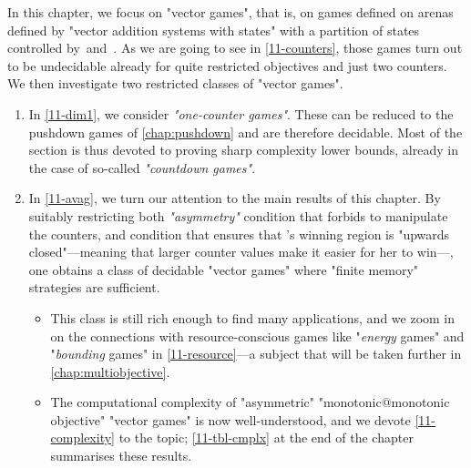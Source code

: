 In this chapter, we focus on "vector games", that is, on games defined
on arenas defined by "vector addition systems with states" with a
partition of states controlled by~\Eve and~\Adam.  As we are going to
see in \cref{11-counters}, those games turn out to be undecidable
already for quite restricted objectives and just two counters.  We
then investigate two restricted classes of "vector games".
\begin{enumerate}
\item In \cref{11-dim1}, we consider \emph{"one-counter games"}.  These can
  be reduced to the pushdown games of \cref{chap:pushdown} and are
  therefore decidable.  Most of the section is thus devoted to proving
  sharp complexity lower bounds, already in the case of so-called
  \emph{"countdown games"}.
\item In \cref{11-avag}, we turn our attention to the main results of
  this chapter.  By suitably restricting both
  \emph{"asymmetry"} condition that forbids \Adam to manipulate the
  counters, and
    condition that ensures that \Eve's winning region is "upwards
    closed"---meaning that larger counter values make it easier for
    her to win---,
  one obtains a class of decidable "vector games" where "finite
  memory" strategies are sufficient.
  \begin{itemize}
  \item   This class is still rich enough to find many applications, and we
  zoom in on the connections with resource-conscious games like
  "\emph{energy} games" and "\emph{bounding} games" in
  \cref{11-resource}---a subject that will be taken further in
  \cref{chap:multiobjective}.
  
  \item   The computational complexity of "asymmetric" "monotonic@monotonic
  objective" "vector games" is now well-understood, and we devote
  \cref{11-complexity} to the topic; \cref{11-tbl-cmplx} at the end of
  the chapter summarises these results.
  \end{itemize}
\end{enumerate}

%

